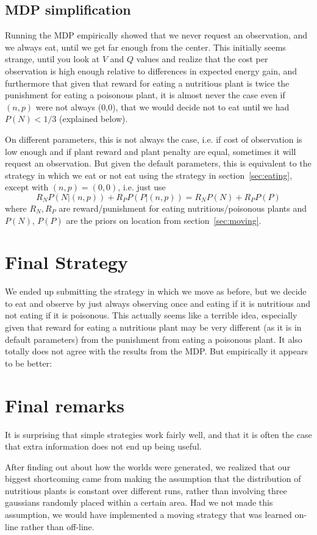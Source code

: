 \documentclass{article}
\begin{document}
\subsection{MDP simplification}
Running the MDP empirically showed that we never request an
observation, and we always eat, until we get far enough from the
center.  This initially seems strange, until you look at $V$ and $Q$
values and realize that the cost per observation is high enough
relative to differences in expected energy gain, and furthermore that
given that reward for eating a nutritious plant is twice the
punishment for eating a poisonous plant, it is almost never the case
even if $(n,p)$ were not always (0,0), that we would decide not to eat
until we had $P(N)<1/3$ (explained below).

On different parameters, this is not always the case, i.e. if cost of
observation is low enough and if plant reward and plant penalty are
equal, sometimes it will request an observation. But given the default
parameters, this is equivalent to the strategy in which we eat or not
eat using the strategy in section~\ref{sec:eating}, except with
$(n,p)=(0,0)$, i.e.  just use
\[R_NP(N|(n,p))+R_PP(P|(n,p))=R_NP(N)+R_PP(P)\]
where $R_N,R_P$ are reward/punishment for eating nutritious/poisonous
plants and $P(N)$, $P(P)$ are the priors on location from
section~\ref{sec:moving}.


\section{Final Strategy}
We ended up submitting the strategy in which we move as before, but we
decide to eat and observe by just always observing once and eating if
it is nutritious and not eating if it is poisonous. This actually
seems like a terrible idea, especially given that reward for eating a
nutritious plant may be very different (as it is in default
parameters) from the punishment from eating a poisonous plant. It also
totally does not agree with the results from the MDP. But empirically
it appears to be better:



\section{Final remarks}
It is surprising that simple strategies work fairly well, and that it
is often the case that extra information does not end up being useful.

After finding out about how the worlds were generated, we realized
that our biggest shortcoming came from making the assumption that the
distribution of nutritious plants is constant over different runs,
rather than involving three gaussians randomly placed within a certain
area. Had we not made this assumption, we would have implemented a
moving strategy that was learned on-line rather than off-line.
\end{document}
